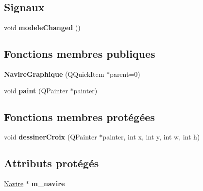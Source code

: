 \subsection*{Signaux}
\begin{DoxyCompactItemize}
\item 
void {\bfseries modele\+Changed} ()\hypertarget{class_navire_graphique_a8895618937c8cc932ab0cca549574ed0}{}\label{class_navire_graphique_a8895618937c8cc932ab0cca549574ed0}

\end{DoxyCompactItemize}
\subsection*{Fonctions membres publiques}
\begin{DoxyCompactItemize}
\item 
{\bfseries Navire\+Graphique} (Q\+Quick\+Item $\ast$parent=0)\hypertarget{class_navire_graphique_a91106b0259c79f39d6e73fb032c7b879}{}\label{class_navire_graphique_a91106b0259c79f39d6e73fb032c7b879}

\item 
void {\bfseries paint} (Q\+Painter $\ast$painter)\hypertarget{class_navire_graphique_afe5ea560d2957f56a37de9f97b950c68}{}\label{class_navire_graphique_afe5ea560d2957f56a37de9f97b950c68}

\end{DoxyCompactItemize}
\subsection*{Fonctions membres protégées}
\begin{DoxyCompactItemize}
\item 
void {\bfseries dessiner\+Croix} (Q\+Painter $\ast$painter, int x, int y, int w, int h)\hypertarget{class_navire_graphique_a363b5a461391387078fb6126bf41ecc0}{}\label{class_navire_graphique_a363b5a461391387078fb6126bf41ecc0}

\end{DoxyCompactItemize}
\subsection*{Attributs protégés}
\begin{DoxyCompactItemize}
\item 
\hyperlink{class_navire}{Navire} $\ast$ {\bfseries m\+\_\+navire}\hypertarget{class_navire_graphique_abea52cd8d08c1b5a9ceb329c0fec957f}{}\label{class_navire_graphique_abea52cd8d08c1b5a9ceb329c0fec957f}

\end{DoxyCompactItemize}
